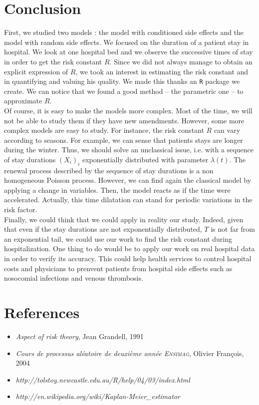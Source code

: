 \documentclass[12pt,twoside]{article}
\begin{document}
\clearpage

\section{Conclusion}
\label{conclusion}
First, we studied two models : the model with conditioned side effects and the model with random side effects. We focused on the duration of a patient stay in hospital.  We look at one hospital bed and we observe 
the successive times of stay in order to get the risk constant $R$. Since we did not always manage to obtain an explicit expression of $R$, we took an interest in estimating the risk constant and in quantifying and valuing his quality. We made this thanks an \texttt{R} package we create. We can notice that we found a good method -- the parametric one -- to approximate $R$.\\

Of course, it is easy to make the models more complex. Most of the time, we will not be able to study them if they have new amendments. However, some more complex models are easy to study. For instance, the risk constant $R$ can vary according to seasons. For example, we can sense 
that patients stays are longer during the winter. Thus, we should solve an unclassical issue, i.e. with a sequence of stay durations $(X_i)_i$ exponentially distributed with parameter $\lambda(t)$. The renewal process described by the sequence of stay durations is a non homogeneous Poisson process. However, we can find again the classical model by applying a change in variables. Then, the model reacts as if the time were accelerated. Actually, this time dilatation can stand for periodic variations in the risk factor. \\

Finally, we could think that we could apply in reality our study. Indeed, given that even if the stay durations are not exponentially distributed, $T$ is not far from an exponential tail, we could use our work to find the risk constant during hospitalization. One thing to do would be to apply our work on real hospital data in order to verify its accuracy. This could help health services to control hospital costs  and physicians to prenvent patients from hospital side effects such as nosocomial infections and venous thrombosis. 

\clearpage

\section{References}
\begin{itemize}
	\item \textsl{Aspect of risk theory}, Jean Grandell, 1991
	\item \textsl{Cours de processus aléatoire de deuxième année \textsc{Ensimag}}, Olivier Fran\c cois, 2004
	\item \textsl{http://tolstoy.newcastle.edu.au/R/help/04/03/index.html}
	\item \textsl{http://en.wikipedia.org/wiki/Kaplan-Meier\_estimator}
\end{itemize}
\end{document}
